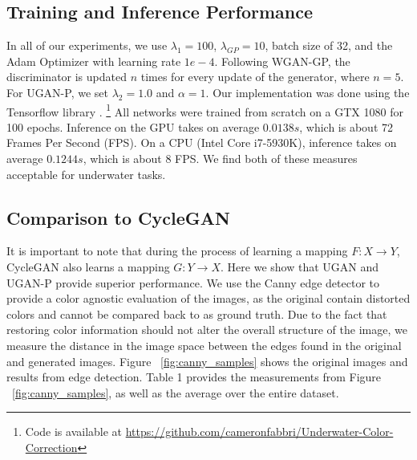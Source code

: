 

\subsection{Training and Inference Performance}
In all of our experiments, we use $\lambda_{1} = 100$, $\lambda_{GP} = 10$, batch size of 32, and the Adam Optimizer 
\cite{kingma2014adam} with learning rate $1e-4$. Following WGAN-GP, the discriminator is updated $n$ times for every update of the 
generator, where $n = 5$. For UGAN-P, we set $\lambda_{2} = 1.0$ and $\alpha = 1$. Our implementation was done using the 
Tensorflow library \cite{abadi2016tensorflow}. \footnote{Code is available at 
\url{https://github.com/cameronfabbri/Underwater-Color-Correction}} All networks were trained from scratch on a GTX 1080 for 100 
epochs. Inference on the GPU takes on average $ 0.0138s$, which is about 72 Frames Per Second (FPS). On a CPU (Intel Core 
i7-5930K), inference takes on average $ 0.1244s$, which is about 8 FPS. We find both of these measures acceptable for underwater 
tasks.

\subsection{Comparison to CycleGAN}
It is important to note that during the process of learning a mapping $F: X \rightarrow Y$, CycleGAN also learns a
mapping $G: Y \rightarrow X$. Here we show that UGAN and UGAN-P provide superior performance. We use the Canny edge
detector \cite{canny1986computational} to provide a color agnostic evaluation of the images, as the original contain
distorted colors and cannot be compared back to as ground truth. Due to the fact that restoring color information
should not alter the overall structure of the image, we measure the distance in the image space between the edges
found in the original and generated images. Figure ~\ref{fig:canny_samples} shows the original images and results from
edge detection. Table 1 provides the measurements from Figure ~\ref{fig:canny_samples}, as well as the average over the
entire dataset.

